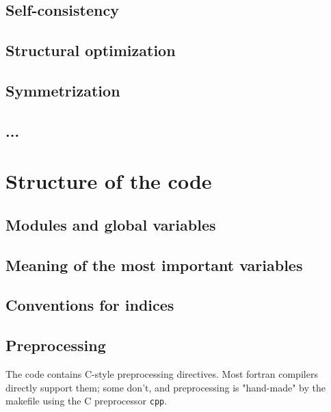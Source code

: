 \documentclass[12pt,a4paper]{article}
\begin{document}
\subsection{Self-consistency}

\subsection{Structural optimization}

\subsection{Symmetrization}

\subsection{...}

\section{Structure of the code}

\subsection{Modules and global variables}

\subsection{Meaning of the most important variables}

\subsection{Conventions for indices}

\subsection{Preprocessing}

The code contains C-style preprocessing directives. Most
fortran compilers directly support them; some don't, and
preprocessing is "hand-made" by the makefile using the C
preprocessor {\tt cpp}.
\end{document}
